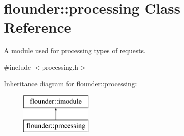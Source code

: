 \hypertarget{classflounder_1_1processing}{}\section{flounder\+:\+:processing Class Reference}
\label{classflounder_1_1processing}


A module used for processing types of requests.  




{\ttfamily \#include $<$processing.\+h$>$}

Inheritance diagram for flounder\+:\+:processing\+:\begin{figure}[H]
\begin{center}
\leavevmode
\includegraphics[height=2.000000cm]{classflounder_1_1processing}
\end{center}
\end{figure}
